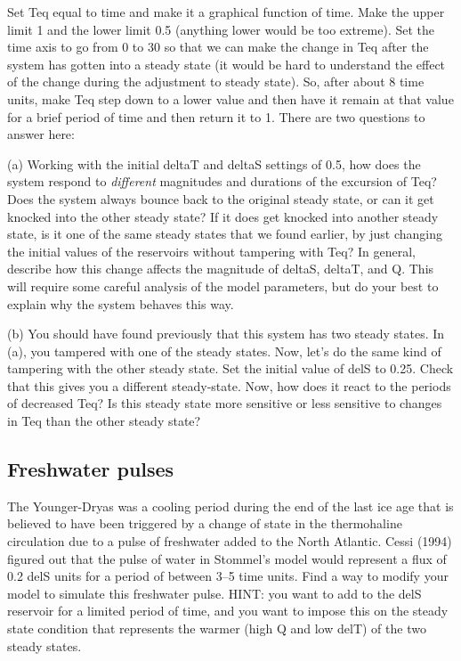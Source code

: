 \documentclass[11pt,letterpaper]{article}
\begin{document}
Set Teq equal to time and make it a graphical function of time. Make the upper limit 1 and the lower limit 0.5 (anything lower would be too extreme). Set the time axis to go from 0 to 30 so that we can make the change in Teq after the system has gotten into a steady state (it would be hard to understand the effect of the change during the adjustment to steady state). So, after about 8 time units, make Teq step down to a lower value and then have it remain at that value for a brief period of time and then return it to 1. There are two questions to answer here:

(a) Working with the initial deltaT and deltaS settings of 0.5, how does the system respond to \textit{different} magnitudes and durations of the excursion of Teq? Does the system always bounce back to the original steady state, or can it get knocked into the other steady state? If it does get knocked into another steady state, is it one of the same steady states that we found earlier, by just changing the initial values of the reservoirs without tampering with Teq? In general, describe how this change affects the magnitude of deltaS, deltaT, and Q. This will require some careful analysis of the model parameters, but do your best to explain why the system behaves this way.

(b) You should have found previously that this system has two steady states. In (a), you tampered with one of the steady states. Now, let’s do the same kind of tampering with the other steady state. Set the initial value of delS to 0.25. Check that this gives you a different steady-state. Now, how does it react to the periods of decreased Teq? Is this steady state more sensitive or less sensitive to changes in Teq than the other steady state?

\subsection{Freshwater pulses}
The Younger-Dryas was a cooling period during the end of the last ice age that is believed to have been triggered by a change of state in the thermohaline circulation due to a pulse of freshwater added to the North Atlantic. Cessi (1994) figured out that the pulse of water in Stommel's model would represent a flux of 0.2 delS units for a period of between 3--5 time units. Find a way to modify your model to simulate this freshwater pulse. HINT: you want to add to the delS reservoir for a limited period of time, and you want to impose this on the steady state condition that represents the warmer (high Q and low delT) of the two steady states.
\end{document}
